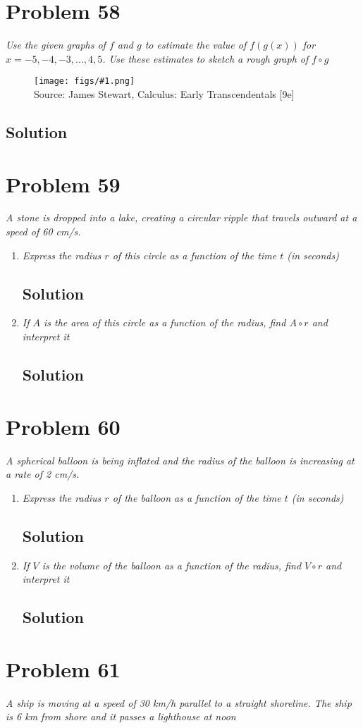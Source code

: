 \documentclass[11pt]{article}
\newcommand{\soln}{\subsection*}
\newcommand{\qn}{\textit}
\newcommand{\imagesource}[1]{{\footnotesize Source: #1}}
\newcommand{\imgqn}[1]{
	\begin{figure}[H]
		\centering
		\texttt{[image: figs/\#1.png]}\\
		\imagesource{James Stewart, Calculus: Early Transcendentals [9e]}
	\end{figure}
}
\begin{document}
\section*{Problem 58}

\qn{Use the given graphs of $f$ and $g$ to estimate the value of $f(g(x))$ for $x=-5,-4,-3,...,4,5$. Use these estimates to sketch a rough graph of $f \circ g$}
\imgqn{1.3.58}

\soln{Solution}

\section*{Problem 59}

\qn{A stone is dropped into a lake, creating a circular ripple that travels outward at a speed of 60 cm/s.}

\begin{enumerate}
	\item \qn{Express the radius $r$ of this circle as a function of the time $t$ (in seconds)}
	\soln{Solution}
	
	\item \qn{If $A$ is the area of this circle as a function of the radius, find $A \circ r$ and interpret it}
	\soln{Solution}
\end{enumerate}

\section*{Problem 60}

\qn{A spherical balloon is being inflated and the radius of the balloon is increasing at a rate of 2 cm/s.}

\begin{enumerate}
	\item \qn{Express the radius $r$ of the balloon as a function of the time $t$ (in seconds)}
	\soln{Solution}
	
	\item \qn{If $V$ is the volume of the balloon as a function of the radius, find $V \circ r$ and interpret it}
	\soln{Solution}
\end{enumerate}

\section*{Problem 61}

\qn{A ship is moving at a speed of 30 km/h parallel to a straight shoreline. The ship is 6 km from shore and it passes a lighthouse at noon }
\end{document}
